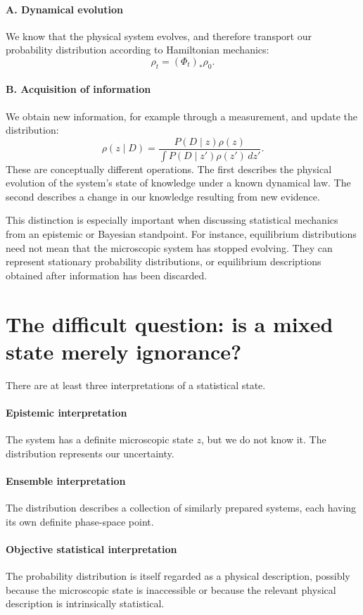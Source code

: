 \paragraph{A. Dynamical evolution}
We know that the physical system evolves, and therefore transport our
probability distribution according to Hamiltonian mechanics:
\[\rho_t=(\Phi_t)_*\rho_0.\]

\paragraph{B. Acquisition of information}
We obtain new information, for example through a measurement, and update the
distribution:
\[\rho(z\mid D)=\frac{P(D\mid z)\rho(z)}{\int P(D\mid z')\rho(z')\,dz'}.\]
These are conceptually different operations.
The first describes the physical evolution of the system's state of knowledge
under a known dynamical law.
The second describes a change in our knowledge resulting from new evidence.

This distinction is especially important when discussing statistical mechanics
from an epistemic or Bayesian standpoint.
For instance, equilibrium distributions need not mean that the microscopic
system has stopped evolving. They can represent stationary probability
distributions, or equilibrium descriptions obtained after information has been
discarded.

\section{ The difficult question: is a mixed state merely ignorance?}
There are at least three interpretations of a statistical state.

\paragraph{Epistemic interpretation}
The system has a definite microscopic state \(z\), but we do not know it. The
distribution represents our uncertainty.

\paragraph{Ensemble interpretation}
The distribution describes a collection of similarly prepared systems, each
having its own definite phase-space point.

\paragraph{Objective statistical interpretation}
The probability distribution is itself regarded as a physical description,
possibly because the microscopic state is inaccessible or because the relevant
physical description is intrinsically statistical.

